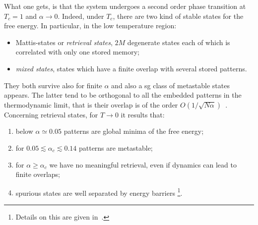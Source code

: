 \documentclass[\rootdir/main.tex]{subfiles}
\begin{document}
What one gets, is that the system undergoes a second order phase transition at $T_c = 1$ and $\alpha \to 0$. Indeed, under $T_c$, there are two kind of stable states for the free energy. In particular, in the low temperature region:
\begin{itemize}
    \item Mattis-states or \emph{retrieval states}, \ie $2M$ degenerate states each of which is correlated with only one stored memory;
    \item \emph{mixed states}, \ie states which have a finite overlap with several stored patterns.
\end{itemize}
They both survive also for finite $\alpha$ and also a \acrfull{sg} class of metastable states appears. The latter tend to be orthogonal to all the embedded patterns in the thermodynamic limit, that is their overlap is of the order $O\left(1 / \sqrt{N \alpha} \right)$~\cite{amit_phase, sk}.\\ 
Concerning retrieval states, for $T \to 0$ it results that:
\begin{enumerate}
    \item below $\alpha \simeq 0.05$ patterns are global minima of the free energy;
    \item for $0.05 \lesssim \alpha_c \lesssim 0.14$ patterns are metastable;
    \item for $\alpha \geq \alpha_c$ we have no meaningful retrieval, even if dynamics can lead to finite overlaps;
    \item spurious states are well separated by energy barriers \footnote{Details on this are given in~\cite{amit2}.}.  
\end{enumerate}
\end{document}
